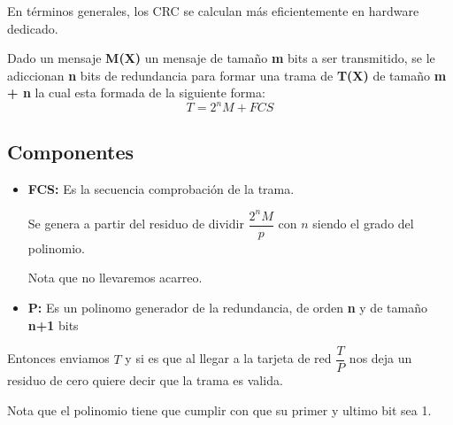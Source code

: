 \documentclass[12pt, fleqn]{report}                             %
\theoremstyle{break}                                            %
\begin{document}
                En términos generales, los CRC se calculan más eficientemente en hardware dedicado.


                Dado un mensaje \textbf{M(X)} un mensaje de tamaño \textbf{m} bits a ser transmitido,
                se le adiccionan \textbf{n} bits de redundancia para formar una trama de \textbf{T(X)}
                de tamaño \textbf{m + n} la cual esta formada de la siguiente forma:
                \begin{equation*}
                    T = 2^n M + FCS
                \end{equation*}

                \subsection{Componentes}
                    
                    \begin{itemize}
                        \item 
                            \textbf{FCS:} Es la secuencia comprobación de la trama. 

                            Se genera a partir del residuo de dividir $\dfrac{2^n M}{p}$ con $n$ siendo
                            el grado del polinomio. 

                            Nota que no llevaremos acarreo.

                        \item
                            \textbf{P:} Es un polinomo generador de la redundancia, de orden \textbf{n}
                            y de tamaño \textbf{n+1} bits

                    \end{itemize}

                    Entonces enviamos $T$ y si es que al llegar a la tarjeta de red $\dfrac{T}{P}$ nos deja
                    un residuo de cero quiere decir que la trama es valida.

                    Nota que el polinomio tiene que cumplir con que su primer y ultimo bit sea 1.


            \clearpage
\end{document}
